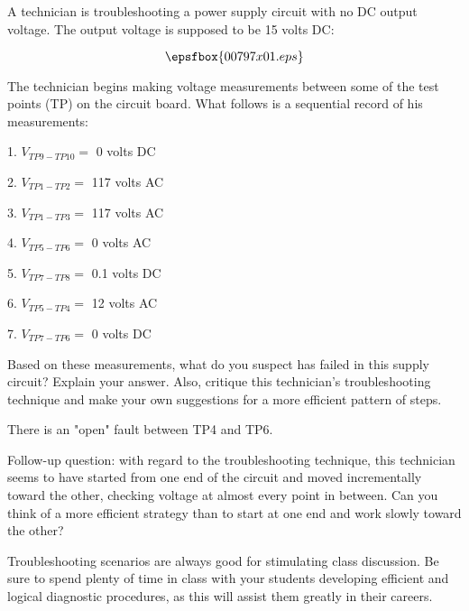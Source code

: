 

A technician is troubleshooting a power supply circuit with no DC output voltage.  The output voltage is supposed to be 15 volts DC:

$$\epsfbox{00797x01.eps}$$

The technician begins making voltage measurements between some of the test points (TP) on the circuit board.  What follows is a sequential record of his measurements:

\medskip
\goodbreak
\item{1.} $V_{TP9-TP10} =$ 0 volts DC
\item{2.} $V_{TP1-TP2} =$ 117 volts AC
\item{3.} $V_{TP1-TP3} =$ 117 volts AC
\item{4.} $V_{TP5-TP6} =$ 0 volts AC
\item{5.} $V_{TP7-TP8} =$ 0.1 volts DC
\item{6.} $V_{TP5-TP4} =$ 12 volts AC
\item{7.} $V_{TP7-TP6} =$ 0 volts DC
\medskip

Based on these measurements, what do you suspect has failed in this supply circuit?  Explain your answer.  Also, critique this technician's troubleshooting technique and make your own suggestions for a more efficient pattern of steps.







There is an "open" fault between TP4 and TP6.

\vskip 10pt

Follow-up question: with regard to the troubleshooting technique, this technician seems to have started from one end of the circuit and moved incrementally toward the other, checking voltage at almost every point in between.  Can you think of a more efficient strategy than to start at one end and work slowly toward the other?







Troubleshooting scenarios are always good for stimulating class discussion.  Be sure to spend plenty of time in class with your students developing efficient and logical diagnostic procedures, as this will assist them greatly in their careers.




